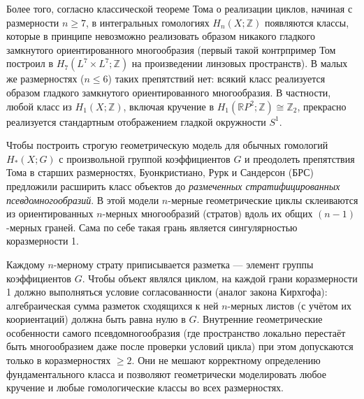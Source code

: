 \documentclass[12pt]{article}
\begin{document}
Более того, согласно классической теореме Тома о реализации циклов, начиная с размерности $n \ge 7$, в интегральных гомологиях $H_n(X; \mathbb{Z})$ появляются классы, которые в принципе невозможно реализовать образом никакого гладкого замкнутого ориентированного многообразия (первый такой контрпример Том построил в $H_7(L^7\times L^7;\mathbb{Z})$ на произведении линзовых пространств). В малых же размерностях ($n \le 6$) таких препятствий нет: всякий класс реализуется образом гладкого замкнутого ориентированного многообразия. В частности, любой класс из $H_1(X; \mathbb{Z})$, включая кручение в $H_1(\mathbb{R}P^2; \mathbb{Z}) \cong \mathbb{Z}_2$, прекрасно реализуется стандартным отображением гладкой окружности $S^1$.

Чтобы построить строгую геометрическую модель для обычных гомологий $H_*(X; G)$ с произвольной группой коэффициентов $G$ и преодолеть препятствия Тома в старших размерностях, Буонкристиано, Рурк и Сандерсон (БРС) предложили расширить класс объектов до \textit{размеченных стратифицированных псевдомногообразий}. В этой модели $n$-мерные геометрические циклы склеиваются из ориентированных $n$-мерных многообразий (стратов) вдоль их общих $(n-1)$-мерных граней. Сама по себе такая грань является сингулярностью коразмерности 1.

Каждому $n$-мерному страту приписывается разметка --- элемент группы коэффициентов $G$. Чтобы объект являлся циклом, на каждой грани коразмерности 1 должно выполняться условие согласованности (аналог закона Кирхгофа): алгебраическая сумма разметок сходящихся к ней $n$-мерных листов (с учётом их коориентаций) должна быть равна нулю в $G$. Внутренние геометрические особенности самого псевдомногообразия (где пространство локально перестаёт быть многообразием даже после проверки условий цикла) при этом допускаются только в коразмерностях $\ge 2$. Они не мешают корректному определению фундаментального класса и позволяют геометрически моделировать любое кручение и любые гомологические классы во всех размерностях.
\end{document}
